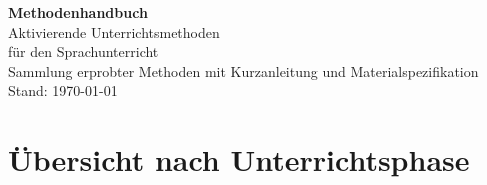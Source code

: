 \documentclass[11pt, a4paper]{article}
\begin{document}

\begin{center}
{\Huge\bfseries\textcolor{akzent}{Methodenhandbuch}}\\[0.5em]
{\LARGE Aktivierende Unterrichtsmethoden}\\[1em]
{\large für den Sprachunterricht}\\[2em]
{\normalsize Sammlung erprobter Methoden mit Kurzanleitung und Materialspezifikation}\\[1em]
{\footnotesize Stand: \today}
\end{center}

\vspace{2em}


\section*{Übersicht nach Unterrichtsphase}
\end{document}
